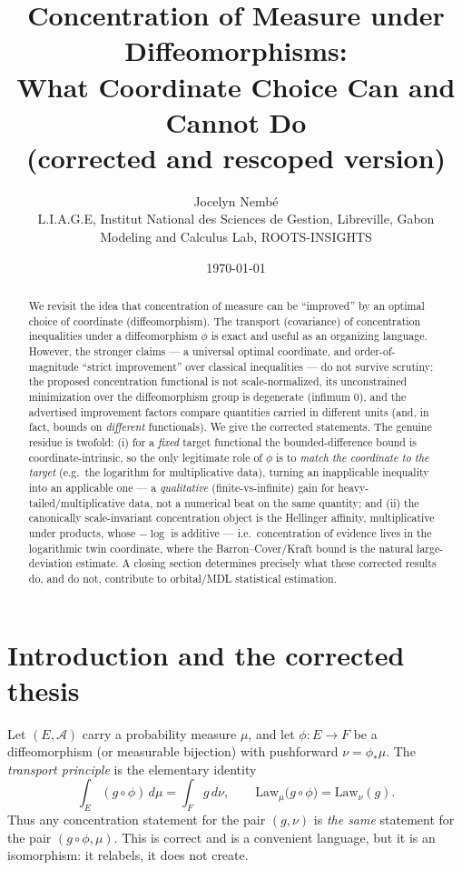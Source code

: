 \documentclass[11pt]{article}
\title{\textbf{Concentration of Measure under Diffeomorphisms:\\
What Coordinate Choice Can and Cannot Do}\\[0.4em]
\large (corrected and rescoped version)}
\author{Jocelyn Nemb\'e\\[0.2em]
\small L.I.A.G.E, Institut National des Sciences de Gestion, Libreville, Gabon\\
\small Modeling and Calculus Lab, ROOTS-INSIGHTS}
\date{\today}
\theoremstyle{plain}
\theoremstyle{definition}
\theoremstyle{remark}
\begin{document}
\maketitle

\begin{abstract}
We revisit the idea that concentration of measure can be ``improved'' by an
optimal choice of coordinate (diffeomorphism). The transport (covariance) of
concentration inequalities under a diffeomorphism $\phi$ is exact and useful as
an organizing language. However, the stronger claims --- a universal optimal
coordinate, and order-of-magnitude ``strict improvement'' over classical
inequalities --- do not survive scrutiny: the proposed concentration functional
is not scale-normalized, its unconstrained minimization over the diffeomorphism
group is degenerate (infimum $0$), and the advertised improvement factors compare
quantities carried in different units (and, in fact, bounds on \emph{different}
functionals). We give the corrected statements. The genuine residue is twofold:
(i) for a \emph{fixed} target functional the bounded-difference bound is
coordinate-intrinsic, so the only legitimate role of $\phi$ is to \emph{match the
coordinate to the target} (e.g.\ the logarithm for multiplicative data), turning
an inapplicable inequality into an applicable one --- a \emph{qualitative}
(finite-vs-infinite) gain for heavy-tailed/multiplicative data, not a numerical
beat on the same quantity; and (ii) the canonically scale-invariant
concentration object is the Hellinger affinity, multiplicative under products,
whose $-\log$ is additive --- i.e.\ concentration of evidence lives in the
logarithmic twin coordinate, where the Barron--Cover/Kraft bound is the natural
large-deviation estimate. A closing section determines precisely what these
corrected results do, and do not, contribute to orbital/MDL statistical
estimation.
\end{abstract}

\tableofcontents

\section{Introduction and the corrected thesis}

Let $(E,\mathcal A)$ carry a probability measure $\mu$, and let $\phi:E\to F$ be a
diffeomorphism (or measurable bijection) with pushforward $\nu=\phi_*\mu$. The
\emph{transport principle} is the elementary identity
\begin{equation}\label{eq:transport}
\int_E (g\circ\phi)\,d\mu=\int_F g\,d\nu ,\qquad
\mathrm{Law}_\mu\big(g\circ\phi\big)=\mathrm{Law}_\nu(g).
\end{equation}
Thus any concentration statement for the pair $(g,\nu)$ is \emph{the same}
statement for the pair $(g\circ\phi,\mu)$. This is correct and is a convenient
language, but it is an isomorphism: it relabels, it does not create.
\end{document}
